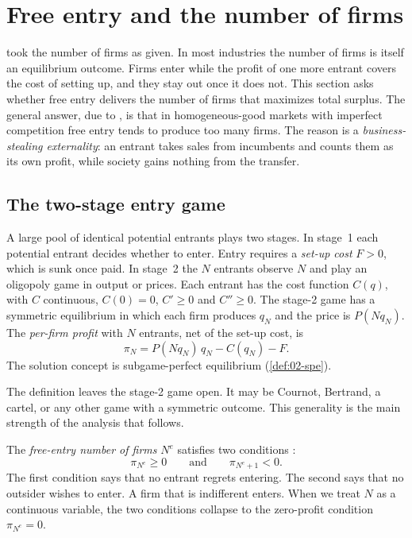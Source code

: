\section{Free entry and the number of firms}\label{sec:02-entry}

 took the number of firms as given. In most industries the number of firms is itself an
equilibrium outcome. Firms enter while the profit of one more entrant covers the cost of setting up, and they stay
out once it does not. This section asks whether free entry delivers the number of firms that maximizes total surplus.
The general answer, due to \citet{MankiwWhinston1986}, is that in homogeneous-good markets with imperfect competition
free entry tends to produce too many firms. The reason is a \emph{business-stealing externality}: an entrant takes
sales from incumbents and counts them as its own profit, while society gains nothing from the transfer.

\subsection{The two-stage entry game}\label{sec:02-entry-game}

\begin{definition}\label{def:02-entry-game}
A large pool of identical potential entrants plays two stages. In stage~1 each potential entrant decides whether to
enter. Entry requires a \emph{set-up cost} $F > 0$, which is sunk once paid. In stage~2 the $N$ entrants observe
$N$ and play an oligopoly game in output or prices. Each entrant has the cost function $C(q)$, with $C$ continuous,
$C(0) = 0$, $C' \ge 0$ and $C'' \ge 0$. The stage-2 game has a symmetric equilibrium in which each firm produces
$q_N$ and the price is $P(N q_N)$. The \emph{per-firm profit} with $N$ entrants, net of the set-up cost, is
\begin{equation}\label{eq:02-entry-profit}
\pi_N = P(N q_N)\, q_N - C(q_N) - F .
\end{equation}
The solution concept is subgame-perfect equilibrium (\cref{def:02-spe}).
\end{definition}

The definition leaves the stage-2 game open. It may be Cournot, Bertrand, a cartel, or any other game with a
symmetric outcome. This generality is the main strength of the analysis that follows.

The \emph{free-entry number of firms} $N^e$ satisfies two conditions \citep[p.~50]{MankiwWhinston1986}:
\begin{equation}\label{eq:02-free-entry}
\pi_{N^e} \ge 0 \qquad\text{and}\qquad \pi_{N^e + 1} < 0 .
\end{equation}
The first condition says that no entrant regrets entering. The second says that no outsider wishes to enter. A firm
that is indifferent enters. When we treat $N$ as a continuous variable, the two conditions collapse to the
zero-profit condition $\pi_{N^e} = 0$.

